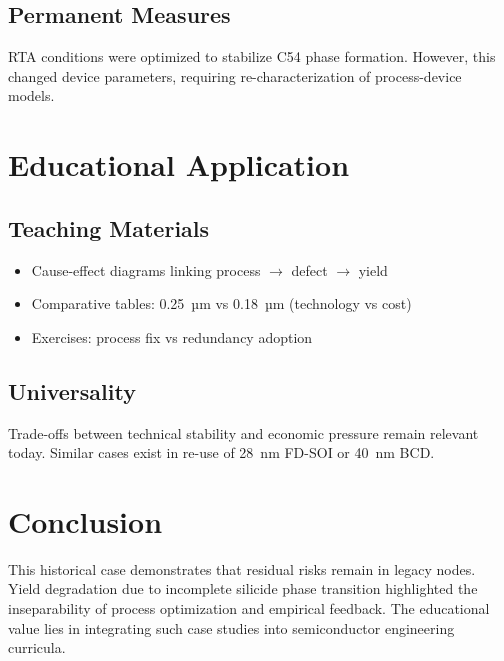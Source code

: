 \documentclass[conference]{IEEEtran}
\begin{document}
\subsection{Permanent Measures}
RTA conditions were optimized to stabilize C54 phase formation. 
However, this changed device parameters, requiring re-characterization of process-device models.

\section{Educational Application}
\subsection{Teaching Materials}
\begin{itemize}
    \item Cause-effect diagrams linking process $\rightarrow$ defect $\rightarrow$ yield
    \item Comparative tables: 0.25~µm vs 0.18~µm (technology vs cost)
    \item Exercises: process fix vs redundancy adoption
\end{itemize}

\subsection{Universality}
Trade-offs between technical stability and economic pressure remain relevant today. 
Similar cases exist in re-use of 28~nm FD-SOI or 40~nm BCD.

\section{Conclusion}
This historical case demonstrates that residual risks remain in legacy nodes. 
Yield degradation due to incomplete silicide phase transition highlighted the inseparability of process optimization and empirical feedback. 
The educational value lies in integrating such case studies into semiconductor engineering curricula.
\end{document}
